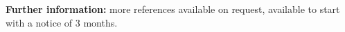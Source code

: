 \vspace*{\fill}
\flushleft
\footnotesize
\item {\color{awesome-darknight}\textbf{Further information:}} more references 
available on request, available to start with a notice of 3 months.